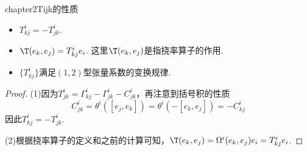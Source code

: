 \begin{mythm}{}{chapter2Tijk的性质}
	\begin{itemize}
		\item[(1)] $T^{i}_{kj}=-T^{i}_{jk}$.
		\item[(2)] $\T(e_{k},e_{j})=T^{i}_{kj}e_{i}$. 这里$\T(e_{k},e_{j})$是指挠率算子的作用.
		\item[(3)] $\{T^{i}_{kj} \}$满足$(1,2)$型张量系数的变换规律.
	\end{itemize}
\end{mythm}
\begin{proof}
	(1)\;因为$T^{i}_{jk}=\Gamma_{kj}^{i} -\Gamma_{jk}^{i}-C_{jk}^{i}$，再注意到括号积的性质
	\[
	C_{jk}^{i}=\theta^{i}\left([e_{j},e_{k}] \right)=\theta^{i}\left(-[e_{k},e_{j}] \right)=-C_{kj}^{i}
	\]
	因此$T^{i}_{kj}=-T^{i}_{jk}$.
	
	(2)\;根据挠率算子的定义和之前的计算可知，$\T(e_{k},e_{j})=\Omega ^{i}(e_{k},e_{j})e_{i}=T^{i}_{kj}e_{i}$.
	

\end{proof}

